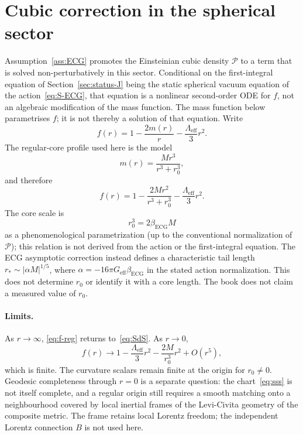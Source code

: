 \section{Cubic correction in the spherical sector}
\label{sec:ch13-cubic}

Assumption~\ref{ass:ECG} promotes the Einsteinian cubic density
\(\mathcal{P}\) to a term that is solved non-perturbatively in this
sector. Conditional on the first-integral equation of
Section~\ref{sec:status-J} being the static spherical vacuum equation
of the action~\eqref{eq:S-ECG}, that equation is a nonlinear
second-order ODE for \(f\), not an algebraic modification of the mass
function. The mass function below parametrises \(f\); it is not
thereby a solution of that equation. Write
\begin{equation}
  \label{eq:mass-function}
  f(r)=1-\frac{2m(r)}{r}-\frac{\Lambda_{\mathrm{eff}}}{3}r^2.
\end{equation}
The regular-core profile used here is the model
\begin{equation}
  \label{eq:m-reg}
  m(r)=\frac{M r^3}{r^3+r_0^3},
\end{equation}
and therefore
\begin{equation}
  \label{eq:f-reg}
  f(r)
  =1-\frac{2M r^2}{r^3+r_0^3}
   -\frac{\Lambda_{\mathrm{eff}}}{3}r^2.
\end{equation}
The core scale is
\begin{equation}
  \label{eq:r0}
  r_0^3=2\beta_{\mathrm{ECG}}M
\end{equation}
as a phenomenological parametrization (up to the conventional
normalization of \(\mathcal P\)); this relation is not derived from
the action or the first-integral equation. The ECG asymptotic
correction instead defines a characteristic tail length
\(r_*\sim|\alpha M|^{1/5}\), where
\(\alpha=-16\pi G_{\mathrm{eff}}\beta_{\mathrm{ECG}}\) in the stated
action normalization. This does not determine \(r_0\) or identify it
with a core length. The book does not claim a measured value of
\(r_0\).

\paragraph{Limits.}
As \(r\to\infty\), \eqref{eq:f-reg} returns to~\eqref{eq:SdS}.
As \(r\to 0\),
\begin{equation}
  \label{eq:f-core}
  f(r)
  \to
  1-\frac{\Lambda_{\mathrm{eff}}}{3}r^2
  -\frac{2M}{r_0^3}r^2
  +O(r^5),
\end{equation}
which is finite. The curvature scalars remain finite at the origin
for \(r_0\neq 0\). Geodesic completeness through \(r=0\) is a
separate question: the chart~\eqref{eq:sss} is not itself complete,
and a regular origin still requires a smooth matching onto a
neighbourhood covered by local inertial frames of the Levi-Civita
geometry of the composite metric. The frame retains local Lorentz
freedom; the independent Lorentz connection \(B\) is not used here.

